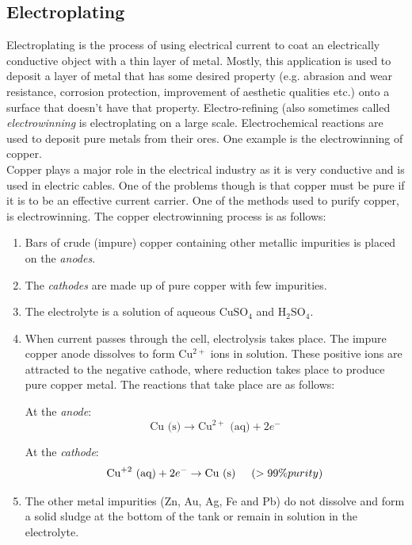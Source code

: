 \subsection{Electroplating}

Electroplating is the process of using electrical current to coat an electrically conductive object with a thin layer of metal. Mostly, this application is used to deposit a layer of metal that has some desired property (e.g. abrasion and wear resistance, corrosion protection, improvement of aesthetic qualities etc.) onto a surface that doesn't have that property. Electro-refining (also sometimes called \textit{electrowinning} is electroplating on a large scale. Electrochemical reactions are used to deposit pure metals from their ores. One example is the electrowinning of copper.\\

Copper plays a major role in the electrical industry as it is very conductive and is used in electric cables. One of the problems though is that copper must be pure if it is to be an effective current carrier. One of the methods used to purify copper, is electrowinning. The copper electrowinning process is as follows:

\begin{enumerate}
  \item Bars of crude (impure) copper containing other metallic
  impurities is placed on the \emph{anodes}.
  \item The \emph{cathodes} are made up of pure copper with few impurities.
  \item The electrolyte is a solution of aqueous $\text{CuSO}_{4}$ and $\text{H}_{2}\text{SO}_{4}$.
  \item When current passes through the cell, electrolysis takes place. The impure copper anode dissolves to form Cu$^{2+}$ ions in solution. These positive ions are attracted to the negative cathode, where reduction takes place to produce pure copper metal. The reactions that take place are as follows:

At the \emph{anode}:
\begin{equation*}
\text{Cu (s)} \rightarrow \text{Cu}^{2+}\text{ (aq)} + 2e^{-}
  \end{equation*}

At the \emph{cathode}:
\begin{equation*}
\text{Cu}^{+2}\text{ (aq)} + 2e^{-} \rightarrow \text{Cu (s)} \hspace{.5cm} (> 99\% purity)
\end{equation*}

  \item The other metal impurities (Zn, Au, Ag, Fe and Pb) do not
  dissolve and form a solid sludge at the bottom of the tank or
  remain in solution in the electrolyte.
\end{enumerate}

